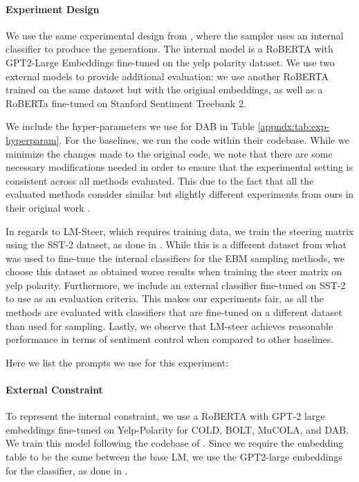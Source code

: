 \paragraph{Experiment Design} We use the same experimental design from \citet{liu2023bolt}, where the sampler uses an internal classifier to produce the generations. The internal model is a RoBERTA with GPT2-Large Embeddings fine-tuned on the yelp polarity dataset. We use two external models to provide additional evaluation: we use another RoBERTA trained on the same dataset but with the original embeddings, as well as a RoBERTa fine-tuned on Stanford Sentiment Treebank 2. 

We include the hyper-parameters we use for DAB in Table \ref{appndx:tab:exp-hyperparam}. For the baselines, we run the code within their codebase. While we minimize the changes made to the original code, we note that there are some necessary modifications needed in order to ensure that the experimental setting is consistent across all methods evaluated. This due to the fact that all the evaluated methods consider similar but slightly different experiments from ours in their original work \citep{qin2022cold, liu2023bolt, han2023lm, kumar2022gradient}.  

In regards to LM-Steer, which requires training data, we train the steering matrix using the SST-2 dataset, as done in \citet{han2023lm}. While this is a different dataset from what was used to fine-tune the internal classifiers for the EBM sampling methods, we choose this dataset as obtained worse results when training the steer matrix on yelp polarity. Furthermore, we include an external classifier fine-tuned on SST-2 to use as an evaluation criteria. This makes our experiments fair, as all the methods are evaluated with classifiers that are fine-tuned on a different dataset than used for sampling. Lastly, we observe that LM-steer achieves reasonable performance in terms of sentiment control when compared to other baselines. 

Here we list the prompts we use for this experiment: 

\paragraph{External Constraint} To represent the internal constraint, we use a RoBERTA with GPT-2 large embeddings fine-tuned on Yelp-Polarity for COLD, BOLT, MuCOLA, and DAB. We train this model following the codebase of \citet{liu2023bolt}. Since we require the embedding table to be the same between the base LM, we use the GPT2-large embeddings for the classifier, as done in \citet{liu2023bolt, kumar2022gradient}. 

